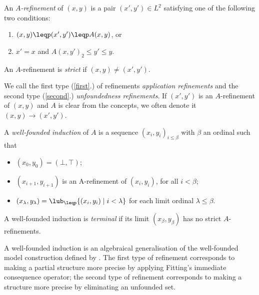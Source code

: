 \begin{definition}\label{002:def:refinement}
An \emph{$A$-refinement} of $(x,y)$ is a pair $(x',y')\in L^2$ satisfying one of the following two conditions:
\begin{enumerate}
	\item $(x,y)\leqp(x',y')\leqp A(x,y)$, or \label{first}
	\item $x'=x$ and  $A(x,y')_2\leq y'\leq y$. \label{second}
\end{enumerate}
An $A$-refinement is \emph{strict} if $(x,y)\neq (x',y')$.
\end{definition}

We call the first type (\ref{first}.) of refinements \emph{application refinements} and the second type (\ref{second}.) \emph{unfoundedness refinements}. If $(x',y')$ is an $A$-refinement of $(x,y)$ and $A$ is clear from the concepts, we often denote it $(x,y)\to(x',y')$.
%

 \begin{definition}
 A \emph{well-founded induction} of $A$  is a sequence 
$(x_i,y_i)_{i\leq \beta}$
with $\beta$ an ordinal such that 
\begin{itemize}
	\item $(x_0,y_0) = (\bot,\top)$;
	\item $(x_{i+1},y_{i+1})$ is an A-refinement of $(x_{i},y_{i})$, for  all $i<\beta$;
	\item $(x_{\lambda},y_{\lambda})= \lub_{\leqp} \{(x_i,y_i)\mid i<\lambda\}$
	      for each limit ordinal $\lambda\leq\beta$.
\end{itemize}
A well-founded induction is \emph{terminal} if its limit $(x_\beta,y_\beta)$ has no strict $A$-refinements.
\end{definition}
A well-founded induction is an algebraical generalisation of the well-founded model construction defined by \cite{GelderRS91}. 
The first type of refinement corresponds to making a partial structure more precise by applying Fitting's immediate consequence operator; the second type of refinement corresponds to making a structure more precise by eliminating an unfounded set. 

